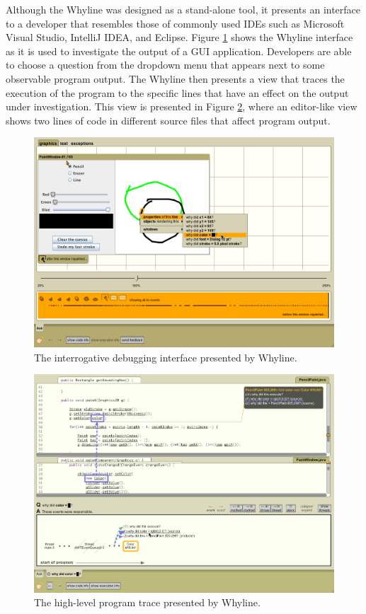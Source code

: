 \par Although the Whyline was designed as a stand-alone tool, it presents an 
interface to a developer that resembles those of commonly used \acp{IDE} such
as Microsoft Visual Studio, IntelliJ IDEA, and Eclipse.
Figure \ref{fig:WhylineQuestion} shows the Whyline interface as it is used
to investigate the output of a \ac{GUI} application.
Developers are able to choose a question from the dropdown menu that appears
next to some observable program output.
The Whyline then presents a view that traces the execution of the program
to the specific lines that have an effect on the output under investigation.
This view is presented in Figure \ref{fig:WhylineTrace},
where an editor-like view shows two lines of code in different source files
that affect program output.

\begin{figure}[ht]
\centering
\includegraphics[width=\textwidth]{./figs/whyline-question-interface.png}
\caption{The interrogative debugging interface presented by Whyline.}
\label{fig:WhylineQuestion}
\end{figure}

\begin{figure}[ht]
\centering
\includegraphics[width=\textwidth]{./figs/whyline-trace-back.png}
\caption{The high-level program trace presented by Whyline.}
\label{fig:WhylineTrace}
\end{figure}

